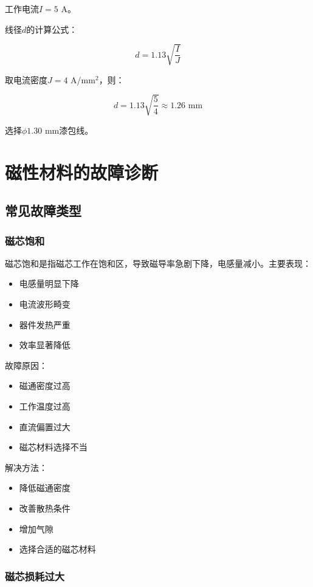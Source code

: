 \documentclass[12pt,UTF8]{ctexbook}
\begin{document}
工作电流$I = 5$ A。

线径$d$的计算公式：

$$ d = 1.13 \sqrt{\frac{I}{J}} $$

取电流密度$J = 4$ A/mm$^2$，则：

$$ d = 1.13 \sqrt{\frac{5}{4}} \approx 1.26 \text{ mm} $$

选择$\phi 1.30$ mm漆包线。

\chapter{磁性材料的故障诊断}

\section{常见故障类型}

\subsection{磁芯饱和}

磁芯饱和是指磁芯工作在饱和区，导致磁导率急剧下降，电感量减小。主要表现：

\begin{itemize}[leftmargin=2cm]
    \item 电感量明显下降
    \item 电流波形畸变
    \item 器件发热严重
    \item 效率显著降低
\end{itemize}

故障原因：

\begin{itemize}[leftmargin=2cm]
    \item 磁通密度过高
    \item 工作温度过高
    \item 直流偏置过大
    \item 磁芯材料选择不当
\end{itemize}

解决方法：

\begin{itemize}[leftmargin=2cm]
    \item 降低磁通密度
    \item 改善散热条件
    \item 增加气隙
    \item 选择合适的磁芯材料
\end{itemize}

\subsection{磁芯损耗过大}
\end{document}
